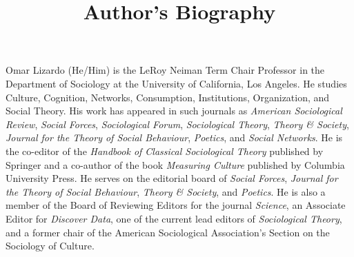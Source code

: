 \documentclass[a4paper,12pt]{extarticle}
\title{Author's Biography}
\begin{document}
\maketitle
Omar Lizardo (He/Him) is the LeRoy Neiman Term Chair Professor in the Department of Sociology at the University of California, Los Angeles. He studies Culture, Cognition, Networks, Consumption, Institutions, Organization, and Social Theory. His work has appeared in such journals as \textit{American Sociological Review}, \textit{Social Forces}, \textit{Sociological Forum}, \textit{Sociological Theory}, \textit{Theory \& Society}, \textit{Journal for the Theory of Social Behaviour}, \textit{Poetics}, and \textit{Social Networks}. He is the co-editor of the \textit{Handbook of Classical Sociological Theory} published by Springer and a co-author of the book \textit{Measuring Culture} published by Columbia University Press. He serves on the editorial board of \textit{Social Forces}, \textit{Journal for the Theory of Social Behaviour}, \textit{Theory \& Society}, and \textit{Poetics}. He is also a member of the Board of Reviewing Editors for the journal \textit{Science}, an Associate Editor for \textit{Discover Data}, one of the current lead editors of \textit{Sociological Theory}, and a former chair of the American Sociological Association's Section on the Sociology of Culture. 
\end{document}
